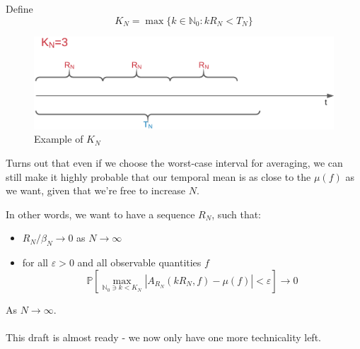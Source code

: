 \documentclass{beamer}
\begin{document}
\begin{frame}
    Define 
    \[K_N = \max\{k \in \mathbb{N}_0: kR_N < T_N\}\]
    \begin{figure}[H]
        \centering
        \includegraphics[scale=0.2]{./img/kn_rn.png}
        \caption{Example of $K_N$}
        \label{fig:kn_rn}
    \end{figure}
    Turns out that even if we choose the worst-case interval for averaging, we can still make it highly probable that our temporal mean is as close to the $\mu(f)$ 
    as we want, given that we're free to increase $N$. 
\end{frame}

\begin{frame}
    In other words, we want to have a sequence $R_N$, such that:
    \begin{itemize}
        \item $R_N / \beta_N \rightarrow 0$ as $N \rightarrow \infty$
        \item for all $\varepsilon > 0$ and all observable quantities $f$
        \[
            \mathbb{P}\left[ \max_{\mathbb{N}_0 \ni k < K_N}|A_{R_N}(kR_N, f) - \mu(f)| < \varepsilon\right] \rightarrow 0
        \]
    \end{itemize}

    As $N \rightarrow \infty$. \\~\\
    This draft is almost ready - we now only have one more technicality left.
\end{frame}
\end{document}
